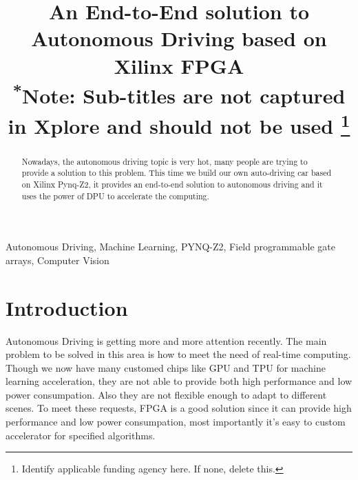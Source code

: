 \documentclass[conference]{IEEEtran}
\begin{document}
\title{An End-to-End solution to Autonomous Driving based on Xilinx FPGA\\
{\footnotesize \textsuperscript{*}Note: Sub-titles are not captured in Xplore and
should not be used}
\thanks{Identify applicable funding agency here. If none, delete this.}
}

\author{
\and
{}
\and
{}
}

\maketitle

\begin{abstract}
Nowadays, the autonomous driving topic is very hot, many people are trying to provide a solution to this problem. This time we build our own auto-driving car based on Xilinx Pynq-Z2, it provides an end-to-end solution to autonomous driving and it uses the power of DPU to accelerate the computing.
\end{abstract}

\begin{IEEEkeywords}
Autonomous Driving, Machine Learning, PYNQ-Z2, Field programmable gate arrays, Computer Vision
\end{IEEEkeywords}

\section{Introduction}
Autonomous Driving is getting more and more attention recently. The main problem to be solved in this area is how to meet the need of real-time computing. 
Though we now have many customed chips like GPU and TPU for machine learning acceleration, they are not able to 
provide both high performance and low power consumpation. Also they are not flexible enough to adapt to different scenes. 
To meet these requests, FPGA is a good solution since it can provide high performance and low power consumpation, most importantly it's easy to custom accelerator for 
specified algorithms.
\end{document}
